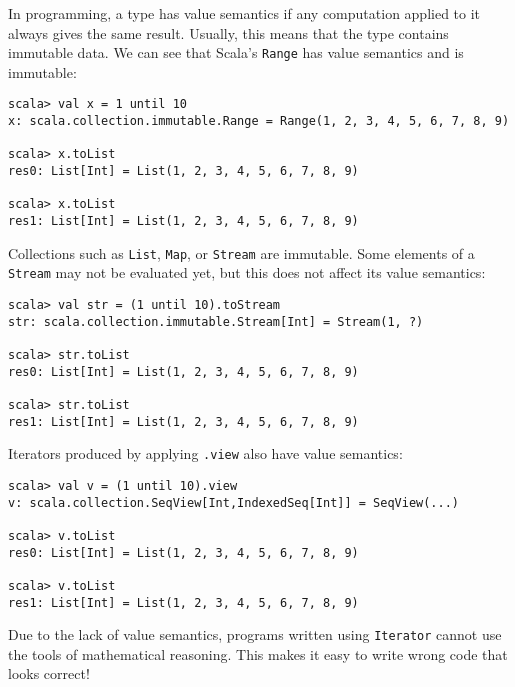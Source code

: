 In programming, a type has value semantics if any computation applied
to it always gives the same result. Usually, this means that the type
contains immutable data. We can see that Scala's \lstinline!Range!
has value semantics and is immutable:
\begin{lstlisting}
scala> val x = 1 until 10
x: scala.collection.immutable.Range = Range(1, 2, 3, 4, 5, 6, 7, 8, 9)

scala> x.toList
res0: List[Int] = List(1, 2, 3, 4, 5, 6, 7, 8, 9)

scala> x.toList
res1: List[Int] = List(1, 2, 3, 4, 5, 6, 7, 8, 9) 
\end{lstlisting}
Collections such as \lstinline!List!,
\lstinline!Map!, or \lstinline!Stream!
are immutable. Some elements of a \lstinline!Stream!
may not be evaluated yet, but this does not affect its value semantics:
\begin{lstlisting}
scala> val str = (1 until 10).toStream
str: scala.collection.immutable.Stream[Int] = Stream(1, ?)

scala> str.toList
res0: List[Int] = List(1, 2, 3, 4, 5, 6, 7, 8, 9)

scala> str.toList
res1: List[Int] = List(1, 2, 3, 4, 5, 6, 7, 8, 9) 
\end{lstlisting}
Iterators produced by applying \lstinline!.view!
also have value semantics:
\begin{lstlisting}
scala> val v = (1 until 10).view
v: scala.collection.SeqView[Int,IndexedSeq[Int]] = SeqView(...)

scala> v.toList
res0: List[Int] = List(1, 2, 3, 4, 5, 6, 7, 8, 9)

scala> v.toList
res1: List[Int] = List(1, 2, 3, 4, 5, 6, 7, 8, 9)
\end{lstlisting}
Due to the lack of value semantics, programs written using \lstinline!Iterator!
cannot use the tools of mathematical reasoning. This
makes it easy to write wrong code that looks correct! 

